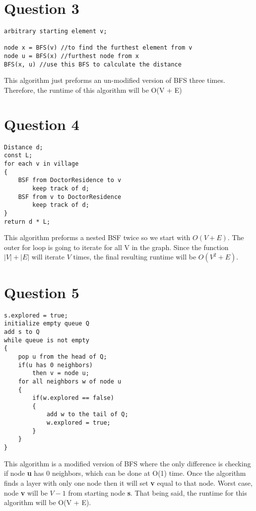 \documentclass[11pt]{book}
\begin{document}
\section*{Question 3}
\begin{lstlisting}
arbitrary starting element v;

node x = BFS(v) //to find the furthest element from v
node u = BFS(x) //furthest node from x
BFS(x, u) //use this BFS to calculate the distance
\end{lstlisting}
This algorithm just preforms an un-modified version of 
BFS three times. Therefore, the runtime of this algorithm will be O(V + E)


\section*{Question 4}
\begin{lstlisting}
Distance d;
const L;
for each v in village
{
	BSF from DoctorResidence to v 
		keep track of d;
	BSF from v to DoctorResidence
		keep track of d;
}
return d * L;
\end{lstlisting}
This algorithm preforms a nested BSF twice so we start with 
$O(V + E)$. The outer for loop is going to iterate for all V in 
the graph. Since the function $|V| + |E|$ will iterate $V$ times, 
the final resulting runtime will be $O(V^2 + E)$. 


\section*{Question 5}
\begin{lstlisting}
s.explored = true;
initialize empty queue Q
add s to Q
while queue is not empty
{
	pop u from the head of Q;
	if(u has 0 neighbors)
		then v = node u;
	for all neighbors w of node u
	{
		if(w.explored == false)
		{
			add w to the tail of Q;
			w.explored = true;
		}
	}
}
\end{lstlisting}
This algorithm is a modified version of BFS where the only 
difference is checking if node \textbf{u} has 0 neighbors, which
can be done at O(1) time. Once the algorithm finds a layer with only
one node then it will set \textbf{v} equal to that node. Worst case, 
node \textbf{v} will be $V-1$ from starting node \textbf{s}. That being 
said, the runtime for this algorithm will be O(V + E).
\end{document}
